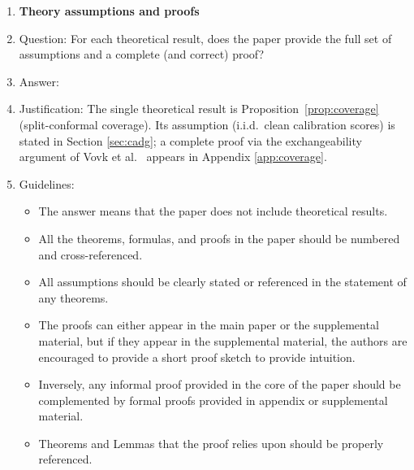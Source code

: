 \begin{enumerate}
\begin{itemize}
        \item The authors should discuss the computational efficiency of the proposed algorithms and how they scale with dataset size.
        \item If applicable, the authors should discuss possible limitations of their approach to address problems of privacy and fairness.
        \item While the authors might fear that complete honesty about limitations might be used by reviewers as grounds for rejection, a worse outcome might be that reviewers discover limitations that aren't acknowledged in the paper. The authors should use their best judgment and recognize that individual actions in favor of transparency play an important role in developing norms that preserve the integrity of the community. Reviewers will be specifically instructed to not penalize honesty concerning limitations.
    \end{itemize}

\item {\bf Theory assumptions and proofs}
    \item[] Question: For each theoretical result, does the paper provide the full set of assumptions and a complete (and correct) proof?
    \item[] Answer: \answerYes{}
    \item[] Justification: The single theoretical result is Proposition~\ref{prop:coverage} (split-conformal coverage). Its assumption (i.i.d.\ clean calibration scores) is stated in Section \ref{sec:cadg}; a complete proof via the exchangeability argument of Vovk et al.\ \cite{vovk2005algorithmic} appears in Appendix \ref{app:coverage}.
    \item[] Guidelines:
    \begin{itemize}
        \item The answer \answerNA{} means that the paper does not include theoretical results. 
        \item All the theorems, formulas, and proofs in the paper should be numbered and cross-referenced.
        \item All assumptions should be clearly stated or referenced in the statement of any theorems.
        \item The proofs can either appear in the main paper or the supplemental material, but if they appear in the supplemental material, the authors are encouraged to provide a short proof sketch to provide intuition. 
        \item Inversely, any informal proof provided in the core of the paper should be complemented by formal proofs provided in appendix or supplemental material.
        \item Theorems and Lemmas that the proof relies upon should be properly referenced. 
    \end{itemize}


\end{enumerate}

